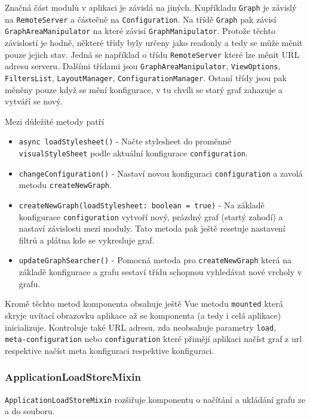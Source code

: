 Značná část modulů v aplikaci je závislá na jiných. Kupříkladu \texttt{Graph} je závislý na \texttt{RemoteServer} a částečně na \texttt{Configuration}. Na třídě \texttt{Graph} pak závisí \texttt{GraphAreaManipulator} na které závisí \texttt{GraphManipulator}. Protože těchto závislostí je hodně, některé třídy byly určeny jako readonly a tedy se může měnit pouze jejich stav. Jedná se například o třídu \texttt{RemoteServer} které lze měnit URL adresu serveru. Dalšími třídami jsou \texttt{GraphAreaManipulator}, \texttt{ViewOptions}, \texttt{FiltersList}, \texttt{LayoutManager}, \texttt{ConfigurationManager}. Ostaní třídy jsou pak měněny pouze když se mění konfigurace, v tu chvíli se starý graf zahazuje a vytváří se nový.

\medskip

Mezi důležité metody patří
\begin{itemize}
  \item \texttt{async loadStylesheet()} - Načte stylesheet do proměnné \\ \texttt{visualStyleSheet} podle aktuální konfigurace \texttt{configuration}.
  \item \texttt{changeConfiguration()} - Nastaví novou konfiguraci \texttt{configuration} a zavolá metodu \texttt{createNewGraph}.
  \item \texttt{createNewGraph(loadStylesheet: boolean = true)} - Na základě konfigurace \texttt{configuration} vytvoří nový, prázdný graf (startý zahodí) a nastaví závislosti mezi moduly. Tato metoda pak ještě resetuje nastavení filtrů a plátna kde se vykresluje graf.
  \item \texttt{updateGraphSearcher()} - Pomocná metoda pro \texttt{createNewGraph} která na základě konfigurace a grafu sestaví třídu schopnou vyhledávat nové vrcholy v grafu.
\end{itemize}

Kromě těchto metod komponenta obsahuje ještě Vue metodu \texttt{mounted} která skryje uvítací obrazovku aplikace až se komponenta (a tedy i celá aplikace) inicializuje. Kontroluje také URL adresu, zda neobsahuje parametry \texttt{load}, \\ \texttt{meta-configuration} nebo \texttt{configuration} které přimějí aplikaci načíst graf z url respektive načíst meta konfiguraci respektive konfiguraci.

\subsubsection{ApplicationLoadStoreMixin}
\texttt{ApplicationLoadStoreMixin} rozšiřuje komponentu o načítání a ukládání grafu ze a do souboru.

